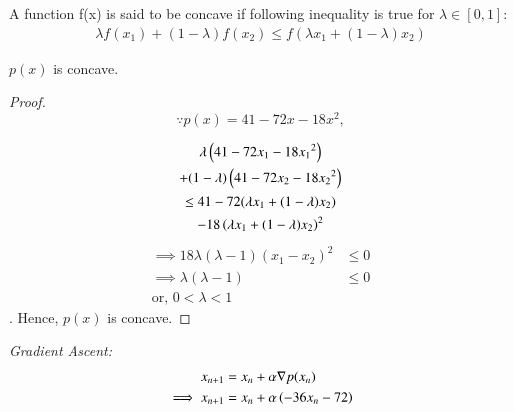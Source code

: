 \begin{definition}
    A function f(x) is said to be concave if following inequality is true for $\lambda \in [0,1] :$  \label{opt/2/2/def}
    \begin{align}
        \lambda f(x_1) + (1-\lambda)f(x_2) \leq f(\lambda x_1 + (1-\lambda)x_2)
    \end{align}    
\end{definition}

\begin{lemma}
    $p(x)$ is concave. 
    \label{opt/2/2/lemma1}
\end{lemma}
\begin{proof}
%
\begin{equation}
\because     p(x)=41-72x-18x^2,
\end{equation}

\begin{multline}
    \lambda\left(41-72{x_1}-18{x_1}^2\right) \\ + 
    (1-\lambda)\left(41-72 {x_2}-18 {x_2}^2\right) \\ \leq
    41-72(\lambda x_1 + (1-\lambda)x_2) \\ -18\left(\lambda x_1 + (1-\lambda)x_2\right)^2
\end{multline}
\begin{align}
\implies     18\lambda(\lambda - 1)({x_1} -{x_2})^2 &\leq 0\\
    \implies \lambda(\lambda - 1)&\leq 0
    \\
    \text{or, } 0 < \lambda < 1
\end{align}.
Hence, $p(x)$ is concave.
\end{proof}
{\em Gradient Ascent: }
%
    \begin{align}
        x_{n+1} &= x_n + \alpha \nabla p(x_n) \\
        \implies x_{n+1} &= x_n + \alpha \left(-36x_n-72\right)
    \end{align}
    
